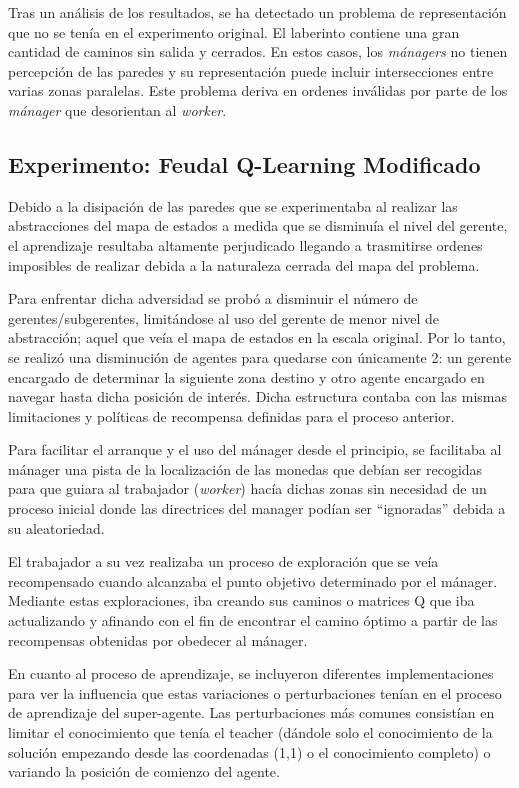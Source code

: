 \documentclass[letterpaper]{article} %
\begin{document}
Tras un análisis de los resultados, se ha detectado un problema de representación que no se tenía en el experimento original. El laberinto contiene 
una gran cantidad de caminos sin salida y cerrados. En estos casos, los \textit{mánagers} no tienen percepción de las paredes y su representación puede incluir
intersecciones entre varias zonas paralelas. Este problema deriva en ordenes inválidas por parte de los \textit{mánager} que desorientan al \textit{worker}. 

\subsection{Experimento: Feudal Q-Learning Modificado}

Debido a la disipación de las paredes que se experimentaba al realizar las abstracciones del mapa de estados a medida que se disminuía
el nivel del gerente, el aprendizaje resultaba altamente perjudicado llegando a trasmitirse ordenes imposibles de realizar debida a la
naturaleza cerrada del mapa del problema.

Para enfrentar dicha adversidad se probó a disminuir el número de gerentes/subgerentes, limitándose al uso del gerente de menor nivel
de abstracción; aquel que veía el mapa de estados en la escala original. Por lo tanto, se realizó una disminución de agentes para 
quedarse con únicamente 2: un gerente encargado de determinar la siguiente zona destino y otro agente encargado en navegar hasta 
dicha posición de interés. Dicha estructura contaba con las mismas limitaciones y políticas de recompensa definidas para el proceso anterior.

Para facilitar el arranque y el uso del mánager desde el principio, se facilitaba al mánager una pista de la localización de las monedas que 
debían ser recogidas para que guiara al trabajador (\textit{worker}) hacía dichas zonas sin necesidad de un proceso inicial donde las directrices del
manager podían ser “ignoradas” debida a su aleatoriedad. 

El trabajador a su vez realizaba un proceso de exploración que se veía recompensado cuando alcanzaba el punto objetivo determinado por el mánager.
Mediante estas exploraciones, iba creando sus caminos o matrices Q que iba actualizando y afinando con el fin de encontrar el camino óptimo a
partir de las recompensas obtenidas por obedecer al mánager.

En cuanto al proceso de aprendizaje, se incluyeron diferentes implementaciones para ver la influencia que estas variaciones o perturbaciones
tenían en el proceso de aprendizaje del super-agente. Las perturbaciones más comunes consistían en limitar el conocimiento que tenía el 
teacher (dándole solo el conocimiento de la solución empezando desde las coordenadas (1,1) o el conocimiento completo) o variando la posición
de comienzo del agente.
\end{document}
